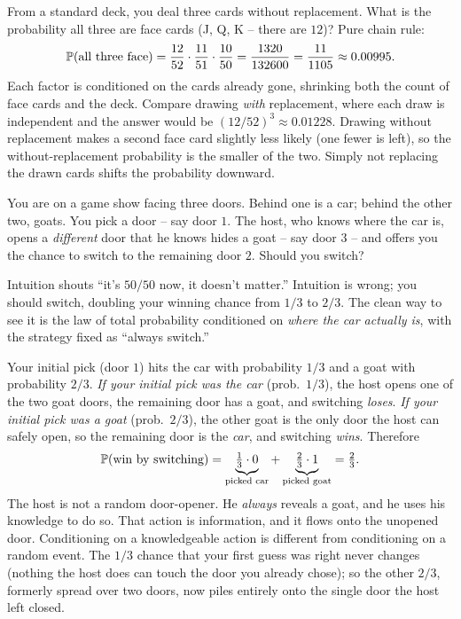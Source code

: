 \begin{example}
\label{ch04:ex-three-face}
From a standard deck, you deal three cards without replacement. What is the probability all three are face cards (J, Q, K -- there are $12$)? Pure chain rule:
\[
\P(\text{all three face}) = \frac{12}{52}\cdot\frac{11}{51}\cdot\frac{10}{50}
= \frac{1320}{132600} = \frac{11}{1105}\approx 0.00995.
\]
Each factor is conditioned on the cards already gone, shrinking both the count of face cards and the deck. Compare drawing \emph{with} replacement, where each draw is independent and the answer would be $(12/52)^3 \approx 0.01228$. Drawing without replacement makes a second face card slightly less likely (one fewer is left), so the without-replacement probability is the smaller of the two. Simply not replacing the drawn cards shifts the probability downward.
\end{example}

\begin{paradoxbox}
You are on a game show facing three doors. Behind one is a car; behind the other two, goats. You pick a door -- say door $1$. The host, who knows where the car is, opens a \emph{different} door that he knows hides a goat -- say door $3$ -- and offers you the chance to switch to the remaining door $2$. Should you switch?

Intuition shouts ``it's $50/50$ now, it doesn't matter.'' Intuition is wrong; you should switch, doubling your winning chance from $1/3$ to $2/3$. The clean way to see it is the law of total probability conditioned on \emph{where the car actually is}, with the strategy fixed as ``always switch.''

Your initial pick (door $1$) hits the car with probability $1/3$ and a goat with probability $2/3$. \emph{If your initial pick was the car} (prob.\ $1/3$), the host opens one of the two goat doors, the remaining door has a goat, and switching \emph{loses}. \emph{If your initial pick was a goat} (prob.\ $2/3$), the other goat is the only door the host can safely open, so the remaining door is the \emph{car}, and switching \emph{wins}. Therefore
\[
\P(\text{win by switching}) = \underbrace{\tfrac13\cdot 0}_{\text{picked car}} + \underbrace{\tfrac23\cdot 1}_{\text{picked goat}} = \tfrac23.
\]
The host is not a random door-opener. He \emph{always} reveals a goat, and he uses his knowledge to do so. That action is information, and it flows onto the unopened door. Conditioning on a knowledgeable action is different from conditioning on a random event. The $1/3$ chance that your first guess was right never changes (nothing the host does can touch the door you already chose); so the other $2/3$, formerly spread over two doors, now piles entirely onto the single door the host left closed.
\end{paradoxbox}

